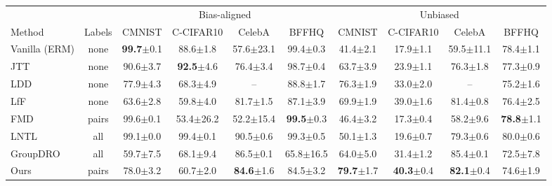 \begin{tabular}{lccccccccc}
\toprule
 &  & \multicolumn{4}{c}{Bias-aligned} & \multicolumn{4}{c}{Unbiased} \\
\cmidrule(lr){3-6}\cmidrule(lr){7-10}
Method & Labels & CMNIST & C-CIFAR10 & CelebA & BFFHQ & CMNIST & C-CIFAR10 & CelebA & BFFHQ \\
\midrule
Vanilla (ERM) & none & \textbf{99.7}{\scriptsize$\pm$0.1} & 88.6{\scriptsize$\pm$1.8} & 57.6{\scriptsize$\pm$23.1} & 99.4{\scriptsize$\pm$0.3} & 41.4{\scriptsize$\pm$2.1} & 17.9{\scriptsize$\pm$1.1} & 59.5{\scriptsize$\pm$11.1} & 78.4{\scriptsize$\pm$1.1} \\
JTT~\cite{liu2021jtt} & none & 90.6{\scriptsize$\pm$3.7} & \textbf{92.5}{\scriptsize$\pm$4.6} & 76.4{\scriptsize$\pm$3.4} & 98.7{\scriptsize$\pm$0.4} & 63.7{\scriptsize$\pm$3.9} & 23.9{\scriptsize$\pm$1.1} & 76.3{\scriptsize$\pm$1.8} & 77.3{\scriptsize$\pm$0.9} \\
LDD~\cite{lee2021ldd} & none & 77.9{\scriptsize$\pm$4.3} & 68.3{\scriptsize$\pm$4.9} & – & 88.8{\scriptsize$\pm$1.7} & 76.3{\scriptsize$\pm$1.9} & 33.0{\scriptsize$\pm$2.0} & – & 75.2{\scriptsize$\pm$1.6} \\
LfF~\cite{nam2020lff} & none & 63.6{\scriptsize$\pm$2.8} & 59.8{\scriptsize$\pm$4.0} & 81.7{\scriptsize$\pm$1.5} & 87.1{\scriptsize$\pm$3.9} & 69.9{\scriptsize$\pm$1.9} & 39.0{\scriptsize$\pm$1.6} & 81.4{\scriptsize$\pm$0.8} & 76.4{\scriptsize$\pm$2.5} \\
FMD~\cite{chen2023fmd} & pairs & 99.6{\scriptsize$\pm$0.1} & 53.4{\scriptsize$\pm$26.2} & 52.2{\scriptsize$\pm$15.4} & \textbf{99.5}{\scriptsize$\pm$0.3} & 46.4{\scriptsize$\pm$3.2} & 17.3{\scriptsize$\pm$0.4} & 58.2{\scriptsize$\pm$9.6} & \textbf{78.8}{\scriptsize$\pm$1.1} \\
LNTL~\cite{kim2019lntl} & all & 99.1{\scriptsize$\pm$0.0} & 99.4{\scriptsize$\pm$0.1} & 90.5{\scriptsize$\pm$0.6} & 99.3{\scriptsize$\pm$0.5} & 50.1{\scriptsize$\pm$1.3} & 19.6{\scriptsize$\pm$0.7} & 79.3{\scriptsize$\pm$0.6} & 80.0{\scriptsize$\pm$0.6} \\
GroupDRO~\cite{sagawa2020groupdro} & all & 59.7{\scriptsize$\pm$7.5} & 68.1{\scriptsize$\pm$9.4} & 86.5{\scriptsize$\pm$0.1} & 65.8{\scriptsize$\pm$16.5} & 64.0{\scriptsize$\pm$5.0} & 31.4{\scriptsize$\pm$1.2} & 85.4{\scriptsize$\pm$0.1} & 72.5{\scriptsize$\pm$7.8} \\
Ours & pairs & 78.0{\scriptsize$\pm$3.2} & 60.7{\scriptsize$\pm$2.0} & \textbf{84.6}{\scriptsize$\pm$1.6} & 84.5{\scriptsize$\pm$3.2} & \textbf{79.7}{\scriptsize$\pm$1.7} & \textbf{40.3}{\scriptsize$\pm$0.4} & \textbf{82.1}{\scriptsize$\pm$0.4} & 74.6{\scriptsize$\pm$1.9} \\
\bottomrule
\end{tabular}
